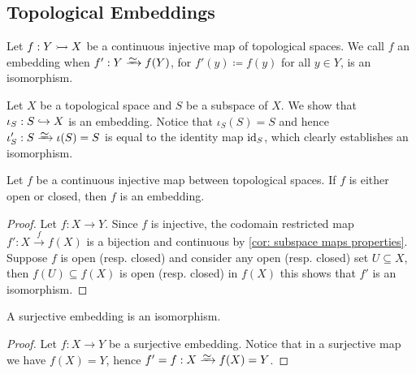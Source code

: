 \subsection{Topological Embeddings}

\begin{definition}[Embedding]\label{def: topological embedding}
    Let \(f: Y \rightarrowtail X\) be a continuous injective map of topological spaces. We
    call \(f\) an embedding when \(f': Y \isoto f(Y)\), for \(f'(y) \coloneq f(y)\)
    for all \(y \in Y\), is an isomorphism.
\end{definition}

\begin{example}
    Let \(X\) be a topological space and \(S\) be a subspace of \(X\). We show
    that \(\iota_S: S \hookrightarrow X\) is an embedding. Notice that
    \(\iota_S(S) = S\) and hence \(\iota_S': S \isoto \iota(S) = S\) is equal to
    the identity map \(\operatorname{id}_S\), which clearly establishes an isomorphism.
\end{example}

\begin{proposition}
    Let \(f\) be a continuous injective map between topological spaces. If \(f\)
    is either open or closed, then \(f\) is an embedding.
\end{proposition}

\begin{proof}
    Let \(f: X \to Y\). Since \(f\) is injective, the codomain restricted map
    \(f': X \xrightarrow f f(X)\) is a bijection and continuous by \cref{cor:
        subspace maps properties}. Suppose \(f\) is open (resp. closed) and consider
    any open (resp. closed) set \(U \subseteq X\), then \(f(U) \subseteq f(X)\) is
    open (resp. closed) in \(f(X)\) this shows that \(f'\) is an isomorphism.
\end{proof}

\begin{proposition}
    A surjective embedding is an isomorphism.
\end{proposition}

\begin{proof}
    Let \(f: X \to Y\) be a surjective embedding. Notice that in a surjective map
    we have \(f(X) = Y\), hence \(f' = f : X \isoto f(X) = Y\).
\end{proof}

